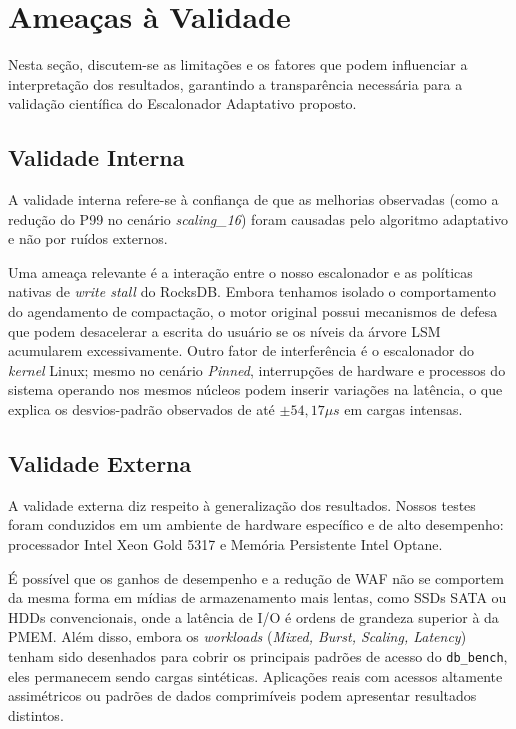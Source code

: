 \FloatBarrier
\section{Ameaças à Validade}

Nesta seção, discutem-se as limitações e os fatores que podem influenciar a interpretação dos resultados, garantindo a transparência necessária para a validação científica do Escalonador Adaptativo proposto.

\subsection*{Validade Interna}
A validade interna refere-se à confiança de que as melhorias observadas (como a redução do P99 no cenário \textit{scaling\_16}) foram causadas pelo algoritmo adaptativo e não por ruídos externos. 

Uma ameaça relevante é a interação entre o nosso escalonador e as políticas nativas de \textit{write stall} do RocksDB. Embora tenhamos isolado o comportamento do agendamento de compactação, o motor original possui mecanismos de defesa que podem desacelerar a escrita do usuário se os níveis da árvore LSM acumularem excessivamente. Outro fator de interferência é o escalonador do \textit{kernel} Linux; mesmo no cenário \textit{Pinned}, interrupções de hardware e processos do sistema operando nos mesmos núcleos podem inserir variações na latência, o que explica os desvios-padrão observados de até $\pm 54,17 \mu s$ em cargas intensas.

\subsection*{Validade Externa}
A validade externa diz respeito à generalização dos resultados. Nossos testes foram conduzidos em um ambiente de hardware específico e de alto desempenho: processador Intel Xeon Gold 5317 e Memória Persistente Intel Optane. 

É possível que os ganhos de desempenho e a redução de WAF não se comportem da mesma forma em mídias de armazenamento mais lentas, como SSDs SATA ou HDDs convencionais, onde a latência de I/O é ordens de grandeza superior à da PMEM. Além disso, embora os \textit{workloads} (\textit{Mixed, Burst, Scaling, Latency}) tenham sido desenhados para cobrir os principais padrões de acesso do \texttt{db\_bench}, eles permanecem sendo cargas sintéticas. Aplicações reais com acessos altamente assimétricos ou padrões de dados comprimíveis podem apresentar resultados distintos.

